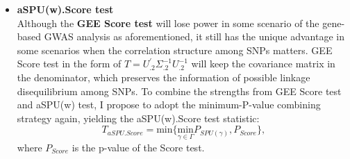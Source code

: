 \documentclass[12pt]{article}
\begin{document}
\begin{itemize}
\item \textbf{aSPU(w).Score test}\\
Although the \textbf{GEE Score test} will lose power in some scenario of the gene-based GWAS analysis as aforementioned, it still has the unique advantage in some scenarios when the correlation structure among SNPs matters. GEE Score test in the form of $T=U_{.2}^{'}\Sigma_{.2}^{-1}U_{.2}^{-1}$ will keep the covariance matrix in the denominator, which preserves the information of possible linkage disequilibrium among SNPs. To combine the strengths from GEE Score test and aSPU(w) test, I propose to adopt the minimum-P-value combining strategy again, yielding the aSPU(w).Score test statistic:
$$
T_{aSPU.Score} = \textrm{min} \Big\{ \underset{\gamma\in\Gamma}{ \textrm{min} } P_{ SPU(\gamma) }, P_{Score} \Big\},
$$ 
where $P_{Score}$ is the p-value of the Score test. 

\end{itemize}


\end{document}
